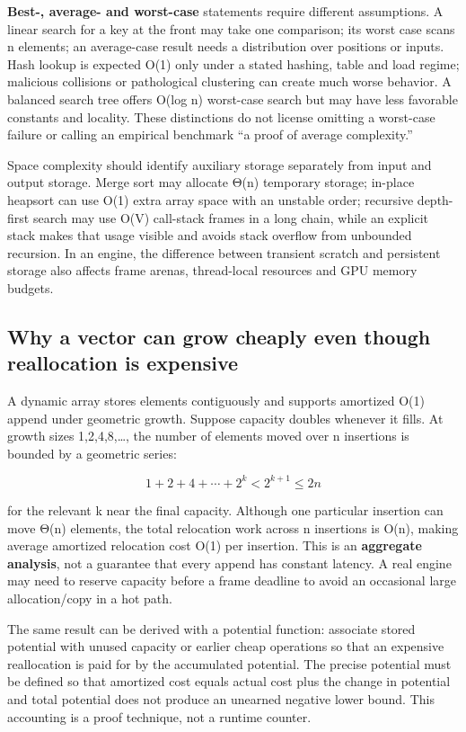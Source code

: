 \textbf{Best-, average- and worst-case} statements require different assumptions. A linear search for a key at the front may take one comparison; its worst case scans n elements; an average-case result needs a distribution over positions or inputs. Hash lookup is expected O(1) only under a stated hashing, table and load regime; malicious collisions or pathological clustering can create much worse behavior. A balanced search tree offers O(log n) worst-case search but may have less favorable constants and locality. These distinctions do not license omitting a worst-case failure or calling an empirical benchmark ``a proof of average complexity.''

Space complexity should identify auxiliary storage separately from input and output storage. Merge sort may allocate Θ(n) temporary storage; in-place heapsort can use O(1) extra array space with an unstable order; recursive depth-first search may use O(V) call-stack frames in a long chain, while an explicit stack makes that usage visible and avoids stack overflow from unbounded recursion. In an engine, the difference between transient scratch and persistent storage also affects frame arenas, thread-local resources and GPU memory budgets.

\subsection{Why a vector can grow cheaply even though reallocation is expensive}\label{01-foundations-i-ch007-why-a-vector-can-grow-cheaply-even-though-reallocation-is-expensive}

A dynamic array stores elements contiguously and supports amortized O(1) append under geometric growth. Suppose capacity doubles whenever it fills. At growth sizes 1,2,4,8,\ldots, the number of elements moved over n insertions is bounded by a geometric series:

\[
1+2+4+\cdots+2^k < 2^{k+1}\leq 2n
\]

for the relevant k near the final capacity. Although one particular insertion can move Θ(n) elements, the total relocation work across n insertions is O(n), making average amortized relocation cost O(1) per insertion. This is an \textbf{aggregate analysis}, not a guarantee that every append has constant latency. A real engine may need to reserve capacity before a frame deadline to avoid an occasional large allocation/copy in a hot path.

The same result can be derived with a potential function: associate stored potential with unused capacity or earlier cheap operations so that an expensive reallocation is paid for by the accumulated potential. The precise potential must be defined so that amortized cost equals actual cost plus the change in potential and total potential does not produce an unearned negative lower bound. This accounting is a proof technique, not a runtime counter.

